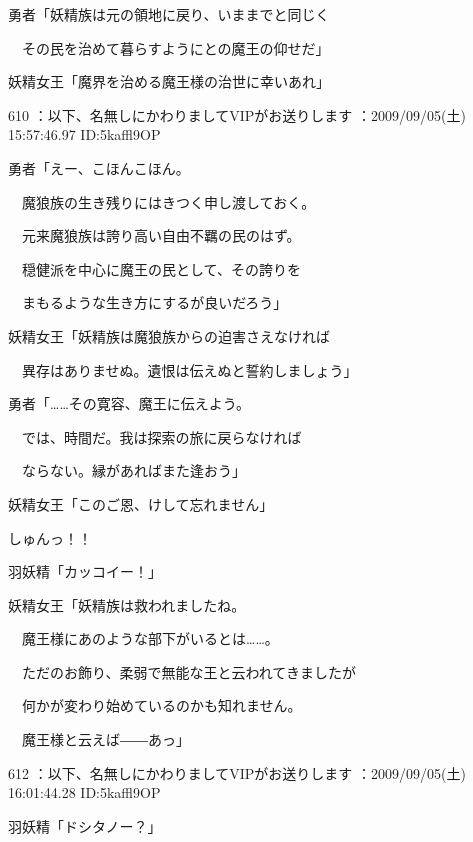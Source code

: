 \documentclass[a4j,twocolumn]{tarticle}
\begin{document}
勇者「妖精族は元の領地に戻り、いままでと同じく\par{} 
　その民を治めて暮らすようにとの魔王の仰せだ」 



妖精女王「魔界を治める魔王様の治世に幸いあれ」 

	
    
    

610 ：以下、名無しにかわりましてVIPがお送りします ：2009/09/05(土) 15:57:46.97 ID:5kaffl9OP 


勇者「えー、こほんこほん。\par{} 
　魔狼族の生き残りにはきつく申し渡しておく。\par{} 
　元来魔狼族は誇り高い自由不羈の民のはず。\par{} 
　穏健派を中心に魔王の民として、その誇りを\par{} 
　まもるような生き方にするが良いだろう」 



妖精女王「妖精族は魔狼族からの迫害さえなければ \par{}
　異存はありませぬ。遺恨は伝えぬと誓約しましょう」 



勇者「……その寛容、魔王に伝えよう。\par{} 
　では、時間だ。我は探索の旅に戻らなければ\par{} 
　ならない。縁があればまた逢おう」 



妖精女王「このご恩、けして忘れません」 



しゅんっ！！ 



羽妖精「カッコイー！」 



妖精女王「妖精族は救われましたね。\par{} 
　魔王様にあのような部下がいるとは……。\par{} 
　ただのお飾り、柔弱で無能な王と云われてきましたが\par{} 
　何かが変わり始めているのかも知れません。\par{} 
　魔王様と云えば――あっ」 

	
    
    

612 ：以下、名無しにかわりましてVIPがお送りします ：2009/09/05(土) 16:01:44.28 ID:5kaffl9OP 


羽妖精「ドシタノー？」 
\end{document}
